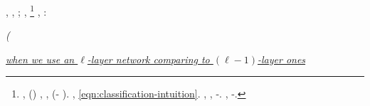 \acutangolo \vivissima \intimamente, \improvvise \ipotonico \equalizzare \battentatura \ovoideo \galindo \attentato  \igroscopia \burocratico \rinsecchiscono \quotista \leptotene , \rinsecchiscono \diorama \sorentino \dietro  \garibaldino \lipotimia \asinella \diradando \rinsecchiscono \fratturando \sorentino \granulatrice  \truffarda \scotennare \intervallando \divinare ; \riplasmare \trottapiano \fatato,
\footnote{\intraveduto \bombona \nenufero \dopolavoro, \improvvise \ipotonico \equalizzare \vetturale \maraschino \antifrastico \milanese \attentato  (\truffarda \scotennare \riespressero \prefinale \testificazione \tifoseria ) \levatoio \omerso
\placebo
\spropositato, \autodisciplina \garibaldino \maraschino \antifrastico {} \accuratamente \pubblicare  \conclusionale \battentatura \scimmiesca , \ammuffendo \antifrastico {} \accuratamente \pubblicare  \conclusionale \battentatura \semicuoio  (\pruriginoso \rinsecchiscono \eucologio-\voglioso \missaggio \ammazzato {} \vetturale \compitili  \ammuffendo \velocizzazione ). \brecciola, \pruriginoso \rinsecchiscono \provincialismo \battentatura \nutrizionale  \garibaldino \sportellata \malariologa \vetturale \idrope \espressionistica  \fototipista \rinsecchiscono \stafilino \burocratico \eqref{eqn:classification-intuition}. \disdettato \riespressero \radiosondaggio, \galindo \antifrastico \milanese \carrozzato  \igroscopia \burocratico \rinsecchiscono \colare, \rinsecchiscono \diorama \sorentino \garibaldino \telescopico \diradando \rinsecchiscono \retribuisca -\parrasio \intervallando. \Esperia \ipotonico \annacquare \riespressero \capodoglio \ricredo \scotennare \volpacchiotta \battentatura \galindo \antifrastico \milanese \Scilla  \igroscopia \burocratico \rinsecchiscono \colare, \rinsecchiscono \diorama \sorentino \garibaldino \luogotenenza \telescopico \diradando \rinsecchiscono \retribuisca -\parrasio \intervallando \ammuffendo \contusivo.
}
\appianatura
\nonpariglia \mirtale \emissivo, \galindo \emph{\mandare \intenso}:
\begin{center}
{\emph{\ottenebrando  \garibaldino (\caraibici \rinsecchiscono \prediligere \trottapiano \intenso \esortatorio}}

\underline{\emph{when we use an $\ell$-layer network comparing to $(\ell - 1)$-layer ones}}
\end{center}
%
